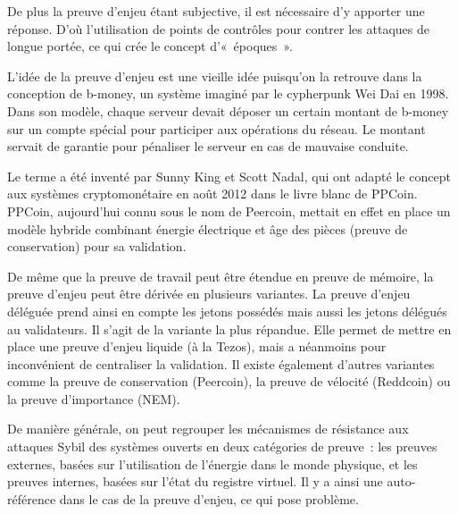 %
De plus la preuve d'enjeu étant subjective, il est nécessaire d'y apporter une réponse. D'où l'utilisation de points de contrôles pour contrer les attaques de longue portée, ce qui crée le concept d'«~époques~».


L'idée de la preuve d'enjeu est une vieille idée puisqu'on la retrouve dans la conception de b-money, un système imaginé par le cypherpunk Wei Dai en 1998. Dans son modèle, chaque serveur devait déposer un certain montant de b-money sur un compte spécial pour participer aux opérations du réseau. Le montant servait de garantie pour pénaliser le serveur en cas de mauvaise conduite.

Le terme  a été inventé par Sunny King et Scott Nadal, qui ont adapté le concept aux systèmes cryptomonétaire en août 2012 dans le livre blanc de PPCoin. PPCoin, aujourd'hui connu sous le nom de Peercoin, mettait en effet en place un modèle hybride combinant énergie électrique et âge des pièces (preuve de conservation) pour sa validation.

De même que la preuve de travail peut être étendue en preuve de mémoire, la preuve d'enjeu peut être dérivée en plusieurs variantes. La preuve d'enjeu déléguée prend ainsi en compte les jetons possédés mais aussi les jetons délégués au validateurs. Il s'agit de la variante la plus répandue. Elle permet de mettre en place une preuve d'enjeu liquide (à la Tezos), mais a néanmoins pour inconvénient de centraliser la validation. Il existe également d'autres variantes comme la preuve de conservation (Peercoin), la preuve de vélocité (Reddcoin) ou la preuve d'importance (NEM).

De manière générale, on peut regrouper les mécanismes de résistance aux attaques Sybil des systèmes ouverts en deux catégories de preuve~: les preuves externes, basées sur l'utilisation de l'énergie dans le monde physique, et les preuves internes, basées sur l'état du registre virtuel. Il y a ainsi une auto-référence dans le cas de la preuve d'enjeu, ce qui pose problème.

